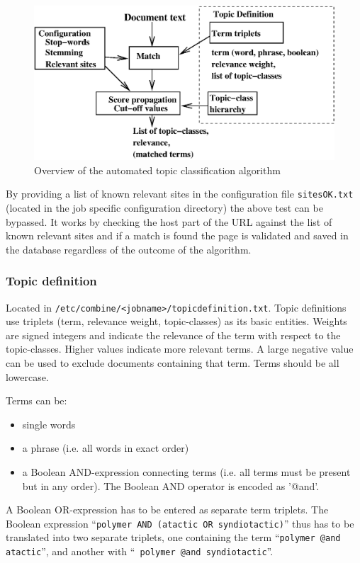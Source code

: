 \begin{figure}[htb]
\begin{center}
 \includegraphics[width=\textwidth]{TopicFilter.xfig.eps}
\end{center}
\caption{Overview of the automated topic classification algorithm}
\label{topicfilter}
\end{figure}

By providing a list of known relevant sites in the configuration
file {\tt sitesOK.txt} (located in the job specific configuration directory) the above test can be bypassed. It works by checking the host
part of the URL against the list of known relevant sites and if a
match is found the page is validated and saved in the database
regardless of the outcome of the algorithm.

\subsubsection{Topic definition}
\label{topicdef}
Located in {\tt /etc/combine/<jobname>/topicdefinition.txt}.
Topic definitions use triplets (term,
relevance weight, topic-classes) as its basic entities. Weights
are signed integers and indicate the relevance of the term with respect to
the topic-classes. Higher values indicate more relevant terms. A large
negative value can be used to exclude documents containing that term.
Terms should be all lowercase.

Terms can be:
\begin{itemize}
  \item single words
  \item a phrase (i.e. all words in exact order)
  \item a Boolean AND-expression connecting terms (i.e. all terms must
      be present but in any order). The Boolean AND operator is encoded as '@and'.
\end{itemize}
A Boolean OR-expression has to be entered as separate term triplets.
The Boolean expression ``{\tt polymer AND (atactic OR syndiotactic)}''
thus has to be translated into two separate triplets, one containing
the term ``{\tt polymer @and atactic}'', and another with ``{\tt
polymer @and syndiotactic}''.

